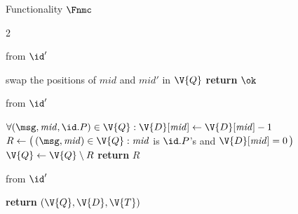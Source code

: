 \begin{interface}[nofloat]{Functionality $\Fnmc$ \\
\params{$\PID$, \quad $\Ps$, \quad $\admits$, \quad
$\uses := \{(\Adv,\serves)\}$, \quad $\pars := \Delta$}}
{\begin{multicols}{2}
\columnbreak

 \quad from $\id'$
\begin{algorithmic}[1]
\algcont
{}
\State swap the positions of $\mathit{mid}$ and $\mathit{mid}'$ in $\V{Q}$ \label{ln:nmcswap}
\State \textbf{return} $\ok$
\algsave
\end{algorithmic}
\vspace{1.4ex}

 \quad from $\id'$
\begin{algorithmic}[1]
\algcont
\State $\forall (\msg, \mathit{mid}, \id.P) \in \V{Q} : \V{D}[\mathit{mid}] \gets \V{D}[\mathit{mid}] - 1$ \label{ln:nmctick}
\State $R \gets \bigl(\, (\msg, \mathit{mid}) \in \V{Q} : \mathit{mid}$ is $\id.P$'s and $\V{D}[\mathit{mid}] = 0 \,\bigr)$
\State $\V{Q} \gets \V{Q} \setminus R$ \label{ln:nmcdeliver}
\State \textbf{return} $R$
\algsave
\end{algorithmic}
\vspace{1.4ex}

 \quad from $\id'$
\begin{algorithmic}[1]
\algcont
\State \textbf{return} $(\V{Q}, \V{D}, \V{T})$ \label{ln:nmcleakall}
\algsave
\end{algorithmic}
\end{multicols}}
\end{interface}
